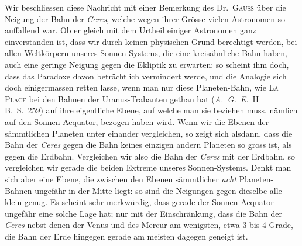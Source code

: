 %
Wir beschliessen diese Nachricht mit einer Bemerkung des Dr.\ \textsc{Gauss} über die Neigung der Bahn der \textit{Ceres}, welche wegen ihrer Grösse vielen Astronomen so auffallend war. Ob er gleich mit dem Urtheil einiger Astronomen ganz einverstanden ist, dass wir durch keinen physischen Grund berechtigt werden, bei allen Weltkörpern unseres Sonnen-Systems, die eine kreisähnliche Bahn haben, auch eine geringe Neigung gegen die Ekliptik zu erwarten: so scheint ihm doch, dass das Paradoxe davon beträchtlich vermindert werde, und die Analogie sich doch einigermassen retten lasse, wenn man nur diese Planeten-Bahn, wie \textsc{La Place} bei den Bahnen der Uranus-Trabanten gethan hat (\textit{A.\ G.\ E.}\ II B.\ S.\ 259) auf ihre eigentliche Ebene, auf welche man sie beziehen muss, nämlich auf den Sonnen-Aequator, bezogen haben wird. Wenn wir die Ebenen der sämmtlichen Planeten unter einander vergleichen, so zeigt sich alsdann, dass die Bahn der \textit{Ceres} gegen die Bahn keines einzigen andern Planeten so gross ist, als gegen die Erdbahn. Vergleichen wir also die Bahn der \textit{Ceres} mit der Erdbahn, so vergleichen wir gerade die beiden Extreme unseres Sonnen-Systems. Denkt man sich aber eine Ebene, die zwischen den Ebenen sämmtlicher \textit{acht} Planeten-Bahnen ungefähr in der Mitte liegt: so sind die Neigungen gegen dieselbe alle klein genug. Es scheint sehr merkwürdig, dass gerade der Sonnen-Aequator ungefähr eine solche Lage hat; nur mit der Einschränkung, dass die Bahn der \textit{Ceres} nebst denen der Venus und des Mercur am wenigsten, etwa 3 bis 4 Grade, die Bahn der Erde hingegen gerade am meisten dagegen geneigt ist.
\begin{flushright}\end{flushright}

